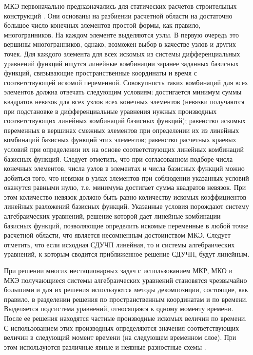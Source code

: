 \documentclass[a4paper,11pt,numreferences,mathsec,kaplist]{isuepsutf8}
\begin{document}
\begin{article}
МКЭ первоначально предназначались для статических расчетов
строительных конструкций \cite{CTO2018,ZTZ2005,EGH2000}. Они основаны
на разбиении расчетной области на достаточно большое число конечных
элементов простой формы, как правило, многогранников.  На каждом
элементе выделяются узлы. В первую очередь это вершины многогранников,
однако, возможен выбор в качестве узлов и других точек. Для каждого
элемента для всех искомых из системы дифференциальных уравнений
функций ищутся линейные комбинации заранее заданных базисных функций,
связывающие пространственные координаты и время с соответствующей
искомой переменной. Совокупность таких комбинаций для всех элементов
должна отвечать следующим условиям: достигается минимум суммы
квадратов невязок для всех узлов всех конечных элементов (невязки
получаются при подстановке в дифференциальные уравнения нужных
производных соответствующих линейных комбинаций базисных функций);
равенство искомых переменных в вершинах смежных элементов при
определении их из линейных комбинаций базисных функций этих элементов;
равенство расчетных краевых условий при определении их на основе
соответствующих линейных комбинаций базисных функций. Следует
отметить, что при согласованном подборе числа конечных элементов,
числа узлов в элементах и числа базисных функций можно добиться того,
что невязки в узлах элементов при соблюдении указанных условий
окажутся равными нулю, т.е. минимума достигает сумма квадратов
невязок.  При этом количество невязок должно быть равно количеству
искомых коэффициентов линейных разложений базисных функций.  Указанные
условия порождают систему алгебраических уравнений, решение которой
дает линейные комбинации базисных функций, позволяющие определить
искомые переменные в любой точке расчетной области, что является
несомненным достоинством МКЭ. Следует отметить, что если исходная
СДУЧП линейная, то и системы алгебраических уравнений, к которым
сводится приближенное решение СДУЧП, будут линейным.

При решении многих нестационарных задач с использованием МКР, МКО и
МКЭ получающиеся системы алгебраических уравнений становятся
чрезвычайно большими и для их решения используются методы
декомпозиции, состоящие, как правило, в разделении решения по
пространственным координатам и по времени.  Выделяется подсистема
уравнений, относящаяся к одному моменту времени.  После ее решения
находятся частные производные искомых величин по времени.  С
использованием этих производных определяются значения соответствующих
величин в следующий момент времени (на следующем временном слое). При
этом используются различные явные и неявные разностные схемы
\cite{J2012}.


\end{article}
\end{document}
